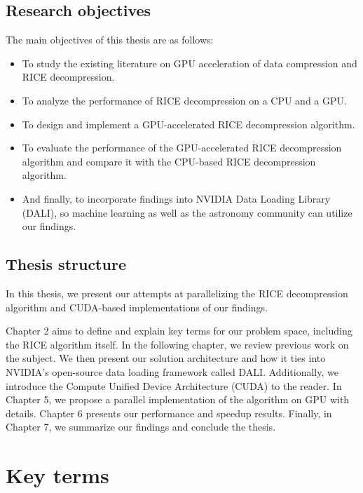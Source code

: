 \documentclass[licencjacka,en]{pracamgr}
\begin{document}
\section{Research objectives}
The main objectives of this thesis are as follows:

\begin{itemize}
	\item To study the existing literature on GPU acceleration of data compression and RICE decompression.
	\item To analyze the performance of RICE decompression on a CPU and a GPU.
	\item To design and implement a GPU-accelerated RICE decompression algorithm.
	\item To evaluate the performance of the GPU-accelerated RICE decompression algorithm and compare it with the CPU-based RICE decompression algorithm.
	\item And finally, to incorporate findings into NVIDIA Data Loading Library (DALI), so machine learning as well as the astronomy community can utilize our findings.
\end{itemize}

\section{Thesis structure}
In this thesis, we present our attempts at parallelizing the RICE decompression algorithm and CUDA-based implementations of our findings.

Chapter 2 aims to define and explain key terms for our problem space, including the RICE algorithm itself. In the following chapter, we review previous work on the subject. We then present our solution architecture and how it ties into NVIDIA's open-source data loading framework called DALI. Additionally, we introduce the Compute Unified Device Architecture (CUDA) to the reader. In Chapter 5, we propose a parallel implementation of the algorithm on GPU with details. Chapter 6 presents our performance and speedup results. Finally, in Chapter 7, we summarize our findings and conclude the thesis.

\chapter{Key terms}\label{r:pojecia}
\end{document}
